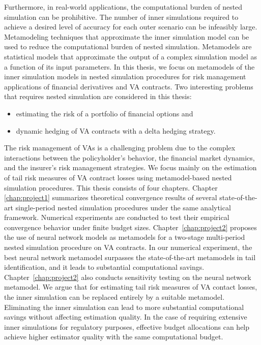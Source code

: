 Furthermore, in real-world applications, the computational burden of nested simulation can be prohibitive.
The number of inner simulations required to achieve a desired level of accuracy for each outer scenario can be infeasibly large.
Metamodeling techniques that approximate the inner simulation model can be used to reduce the computational burden of nested simulation.
Metamodels are statistical models that approximate the output of a complex simulation model as a function of its input parameters.
In this thesis, we focus on metamodels of the inner simulation models in nested simulation procedures for risk management applications of financial derivatives and VA contracts.
Two interesting problems that requires nested simulation are considered in this thesis:  
\begin{itemize}
    \item estimating the risk of a portfolio of financial options and 
    \item dynamic hedging of VA contracts with a delta hedging strategy.
\end{itemize}
The risk management of VAs is a challenging problem due to the complex interactions between the policyholder's behavior, the financial market dynamics, and the insurer's risk management strategies.
We focus mainly on the estimation of tail risk measures of VA contract losses using metamodel-based nested simulation procedures.
This thesis consists of four chapters. 
Chapter \ref{chap:project1} summarizes theoretical convergence results of several state-of-the-art single-period nested simulation procedures under the same analytical framework. 
Numerical experiments are conducted to test their empirical convergence behavior under finite budget sizes.
Chapter~\ref{chap:project2} proposes the use of neural network models as metamodels for a two-stage multi-period nested simulation procedure on VA contracts. 
In our numerical experiment, the best neural network metamodel surpasses the state-of-the-art metamodels in tail identification, and it leads to substantial computational savings. 
Chapter~\ref{chap:project2} also conducts sensitivity testing on the neural network metamodel. 
We argue that for estimating tail risk measures of VA contact losses, the inner simulation can be replaced entirely by a suitable metamodel. 
Eliminating the inner simulation can lead to more substantial computational savings without affecting estimation quality. 
In the case of requiring extensive inner simulations for regulatory purposes, effective budget allocations can help achieve higher estimator quality with the same computational budget.
